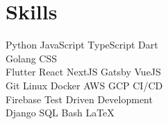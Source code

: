 \documentclass[]{resume}
\begin{document}
\begin{minipage}[t]{0.35\textwidth}
\section{Skills}
Python \textbullet{} JavaScript \textbullet{} TypeScript \textbullet{} Dart  \\
Golang \textbullet{} CSS \\
\vspace{8pt}
Flutter \textbullet{} React \textbullet{} NextJS \textbullet{} Gatsby \textbullet{} VueJS \\
\vspace{8pt}
Git \textbullet{} Linux \textbullet{} Docker \textbullet{} AWS \textbullet{} GCP \textbullet{} CI/CD \\
Firebase \textbullet{} Test Driven Development \\
\vspace{8pt}
Django \textbullet{} SQL  \textbullet{} Bash  \textbullet{} \LaTeX \\
\sectionsep

%
%

\end{minipage} 
\hfill
\end{document}
